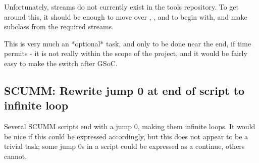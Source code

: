 Unfortunately, streams do not currently exist in the tools repository. To get around this, it should be enough to move over , , and  to begin with, and make  subclass from the required streams.

This is very much an *optional* task, and only to be done near the end, if time permits - it is not really within the scope of the project, and it would be fairly easy to make the switch after GSoC.

\subsection{SCUMM: Rewrite jump 0 at end of script to infinite loop}
Several SCUMM scripts end with a jump 0, making them infinite loops. It would be nice if this could be expressed accordingly, but this does not appear to be a trivial task; some jump 0s in a script could be expressed as a continue, others cannot.
